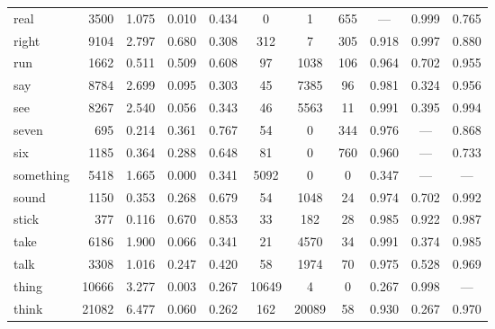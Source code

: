 \begin{landscape}
\begin{longtable}[c]{ l | r r c c | c c c | c c c }
  real       & 3500  & 1.075                   & 0.010           & 0.434      & 0         & 1           & 655          & —         & 0.999       & 0.765\\
  right      & 9104  & 2.797                   & 0.680           & 0.308      & 312       & 7           & 305          & 0.918     & 0.997       & 0.880\\
  run        & 1662  & 0.511                   & 0.509           & 0.608      & 97        & 1038        & 106          & 0.964     & 0.702       & 0.955\\
  say        & 8784  & 2.699                   & 0.095           & 0.303      & 45        & 7385        & 96           & 0.981     & 0.324       & 0.956\\
  see        & 8267  & 2.540                   & 0.056           & 0.343      & 46        & 5563        & 11           & 0.991     & 0.395       & 0.994\\
  seven      & 695   & 0.214                   & 0.361           & 0.767      & 54        & 0           & 344          & 0.976     & —           & 0.868\\
  six        & 1185  & 0.364                   & 0.288           & 0.648      & 81        & 0           & 760          & 0.960     & —           & 0.733\\
  something  & 5418  & 1.665                   & 0.000           & 0.341      & 5092      & 0           & 0            & 0.347     & —           & —\\
  sound      & 1150  & 0.353                   & 0.268           & 0.679      & 54        & 1048        & 24           & 0.974     & 0.702       & 0.992\\
  stick      & 377   & 0.116                   & 0.670           & 0.853      & 33        & 182         & 28           & 0.985     & 0.922       & 0.987\\
  take       & 6186  & 1.900                   & 0.066           & 0.341      & 21        & 4570        & 34           & 0.991     & 0.374       & 0.985\\
  talk       & 3308  & 1.016                   & 0.247           & 0.420      & 58        & 1974        & 70           & 0.975     & 0.528       & 0.969\\
  thing      & 10666 & 3.277                   & 0.003           & 0.267      & 10649     & 4           & 0            & 0.267     & 0.998       & —\\
  think      & 21082 & 6.477                   & 0.060           & 0.262      & 162       & 20089       & 58           & 0.930     & 0.267       & 0.970\\

\end{longtable}
\end{landscape}
